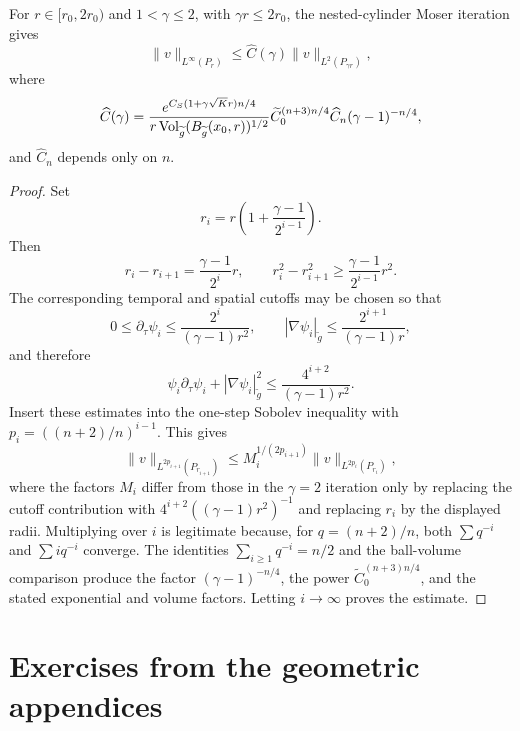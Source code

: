 \begin{proposition}
\label{prop:chow-iii-appj-solution-25-7}
For \(r\in[r_0,2r_0)\) and \(1<\gamma\leq2\), with
\(\gamma r\leq2r_0\), the nested-cylinder Moser iteration gives
\[
 \|v\|_{L^\infty(P_r)}\leq\widehat C(\gamma)
 \|v\|_{L^2(P_{\gamma r})},
\]
where
\[
 \widehat C(\gamma)=
 \frac{e^{C_S(1+\gamma\sqrt K r)n/4}}
 {r\operatorname{Vol}_{\widetilde g}(B_{\widetilde g}(x_0,r))^{1/2}}
 \widetilde C_0^{(n+3)n/4}\widehat C_n(\gamma-1)^{-n/4},
\]
and \(\widehat C_n\) depends only on \(n\).
\end{proposition}
\begin{proof}
Set
\[
 r_i=r\left(1+\frac{\gamma-1}{2^{i-1}}\right).
\]
Then
\[
 r_i-r_{i+1}=\frac{\gamma-1}{2^i}r,
 \qquad
 r_i^2-r_{i+1}^2\geq\frac{\gamma-1}{2^{i-1}}r^2.
\]
The corresponding temporal and spatial cutoffs may be chosen so that
\[
 0\leq\partial_\tau\psi_i\leq
 \frac{2^i}{(\gamma-1)r^2},
 \qquad
 |\nabla\psi_i|_{\widetilde g}\leq
 \frac{2^{i+1}}{(\gamma-1)r},
\]
and therefore
\[
 \psi_i\partial_\tau\psi_i+|\nabla\psi_i|_{\widetilde g}^2
 \leq\frac{4^{i+2}}{(\gamma-1)r^2}.
\]
Insert these estimates into the one-step Sobolev inequality with
\(p_i=((n+2)/n)^{i-1}\).  This gives
\[
 \|v\|_{L^{2p_{i+1}}(P_{r_{i+1}})}
 \leq M_i^{1/(2p_{i+1})}
 \|v\|_{L^{2p_i}(P_{r_i})},
\]
where the factors \(M_i\) differ from those in the \(\gamma=2\) iteration
only by replacing the cutoff contribution with
\(4^{i+2}((\gamma-1)r^2)^{-1}\) and replacing \(r_i\) by the displayed
radii.  Multiplying over \(i\) is legitimate because, for
\(q=(n+2)/n\), both \(\sum q^{-i}\) and \(\sum iq^{-i}\) converge.
The identities \(\sum_{i\geq1}q^{-i}=n/2\) and the ball-volume comparison
produce the factor \((\gamma-1)^{-n/4}\), the power
\(\widetilde C_0^{(n+3)n/4}\), and the stated exponential and volume
factors.  Letting \(i\to\infty\) proves the estimate.
\end{proof}

\section{Exercises from the geometric appendices}

